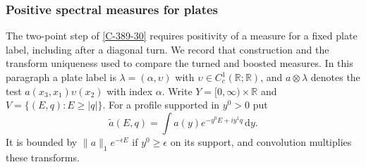 \documentclass[11pt,letterpaper,reqno]{amsart}
\theoremstyle{definition}
\theoremstyle{remark}
\begin{document}
\subsubsection{Positive spectral measures for plates}

The two-point step of \cref{C-389-30} requires positivity of
a measure for a fixed plate label, including after a diagonal
turn. We record that construction and the transform uniqueness
used to compare the turned and boosted measures.
In this paragraph a plate label is
$\lambda=(\alpha,\upsilon)$ with
$\upsilon\in C_c^1(\mathbb R;\mathbb R)$, and
$a\otimes\lambda$ denotes the test
$a(x_3,x_1)\upsilon(x_2)$ with index $\alpha$.
Write $Y=[0,\infty)\times\mathbb R$ and
$V=\{(E,q):E\ge|q|\}$. For a profile supported in $y^0>0$ put
\[
 \widetilde a(E,q)=\int a(y)e^{-y^0E+iy^1q}\,\mathrm{d}y.
\]
It is bounded by $\|a\|_1e^{-\epsilon E}$ if
$y^0\ge\epsilon$ on its support, and convolution multiplies
these transforms.
\end{document}
